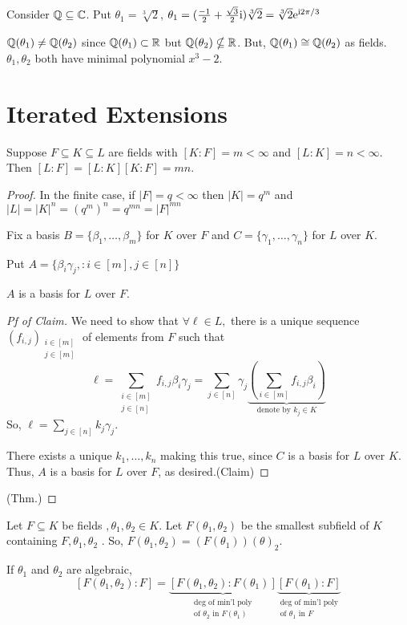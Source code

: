 \documentclass[notes.tex]{subfiles}
\begin{document}
\begin{eg}
	Consider $\mathbb{Q}\subseteq\mathbb{C}$.
	Put $\theta_1 = \sqrt[3]{2}$, $\theta_1 = (\frac{-1}{2} + \frac{\sqrt{3}}{2}\mathrm{i})\sqrt[3]{2} = \sqrt[3]{2}\mathrm{e}^{\mathrm{i} 2\pi/3}$

	$\mathbb{Q}(\theta_1)\ne \mathbb{Q}(\theta_2)$ since $\mathbb{Q}(\theta_1)\subset \mathbb{R}$ but $\mathbb{Q}(\theta_2)\nsubseteq\mathbb{R}$.
	But, $\mathbb{Q}(\theta_1)\cong\mathbb{Q}(\theta_2)$ as fields. $\theta_1, \theta_2$ both have minimal polynomial $x^3 - 2$.
\end{eg}

\section*{Iterated Extensions}
\begin{theorem}
	Suppose $F\subseteq K\subseteq L$ are fields with $[K:F] = m < \infty$ and $[L:K] = n < \infty$.
	Then $[L:F] = [L:K][K:F] = mn$.
\end{theorem}

\begin{proof}
	In the finite case, if $|F| = q < \infty$ then $|K| = q^m$ and $|L| = |K|^n = (q^m)^n = q^{mn} = |F|^{mn}$

	Fix a basis $B = \{\beta_1,\ldots, \beta_m\}$ for $K$ over $F$ and $C = \{\gamma_1,\ldots, \gamma_n\}$ for $L$ over $K$.

	Put $A = \{\beta_i\gamma_j, : i \in[m], j\in[n]\}$

	\begin{claim}
		$A$ is a basis for $L$ over $F$.
	\end{claim}
	\begin{proof}[Pf of Claim]
		We need to show that $\forall\ell\in L,$ there is a unique sequence $(f_{i, j})_{\substack{i\in[m]\\j\in[m]}}$ of elements from $F$ such that
		\[
			\ell 
			= \sum_{\substack{i\in[m]\\j\in[n]}}f_{i, j}\beta_i \gamma_j
			= \sum_{j\in[n]}\gamma_j\underbrace{\left(\sum_{i\in[m]} f_{i, j}\beta_i \right)}_{\text{denote by }k_j\in K}
		\]
		So, $\ell = \sum_{j\in[n]}k_j \gamma_j$.

		There exists a unique $k_1, \ldots, k_n$ making this true, since $C$ is a basis for $L$ over $K$. Thus, $A$ is a basis for $L$ over $F$, as desired.\qedhere(Claim)
	\end{proof}\qedhere(Thm.)
\end{proof}

\begin{defn}
	Let $F\subseteq K$ be fields $, \theta_1, \theta_2\in K$.
	Let $F(\theta_1, \theta_2)$ be the smallest subfield of $K$ containing $F, \theta_1, \theta_2$ . So, $F(\theta_1, \theta_2) = (F(\theta_1))(\theta)_2$. 
\end{defn}
\begin{corollary}
	If $\theta_1$ and $\theta_2$ are algebraic, 
	\[
		[F(\theta_1, \theta_2):F] 
		= \underbrace{[F(\theta_1, \theta_2):F(\theta_1)]}_{\substack{\text{deg of min'l poly}\\ \text{of }\theta_2\text{ in }F(\theta_1)}} \underbrace{[F(\theta_1):F]}_{\substack{\text{deg of min'l poly}\\\text{of }\theta_1 \text{ in }F}}
	\]
\end{corollary}
\end{document}
